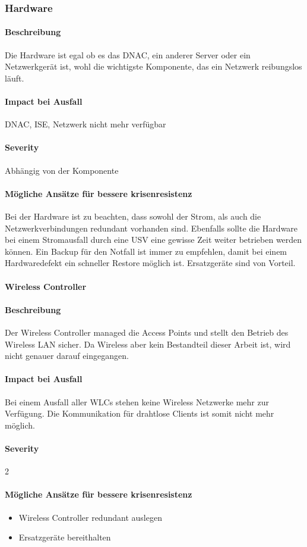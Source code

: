 \subsubsection{Hardware}
\paragraph{Beschreibung}
Die Hardware ist egal ob es das DNAC, ein anderer Server oder ein Netzwerkgerät ist, wohl die wichtigste Komponente, das ein Netzwerk reibungslos läuft.

\paragraph{Impact bei Ausfall}
DNAC, ISE, Netzwerk nicht mehr verfügbar

\paragraph{Severity} Abhängig von der Komponente

\paragraph{Mögliche Ansätze für bessere krisenresistenz}
Bei der Hardware ist zu beachten, dass sowohl der Strom, als auch die Netzwerkverbindungen redundant vorhanden sind. Ebenfalls sollte die Hardware bei einem Stromausfall durch eine USV eine gewisse Zeit weiter betrieben werden können. Ein Backup für den Notfall ist immer zu empfehlen, damit bei einem Hardwaredefekt ein schneller Restore möglich ist.
Ersatzgeräte sind von Vorteil.

\paragraph{Wireless Controller}
\paragraph{Beschreibung}
Der Wireless Controller managed die Access Points und stellt den Betrieb des Wireless LAN sicher. Da Wireless aber kein Bestandteil dieser Arbeit ist, wird nicht genauer darauf eingegangen.

\paragraph{Impact bei Ausfall}
Bei einem Ausfall aller WLCs stehen keine Wireless Netzwerke mehr zur Verfügung. Die Kommunikation für drahtlose Clients ist somit nicht mehr möglich.

\paragraph{Severity} 2

\paragraph{Mögliche Ansätze für bessere krisenresistenz}
\begin{itemize}
	\item Wireless Controller redundant auslegen
	\item Ersatzgeräte bereithalten
\end{itemize}
